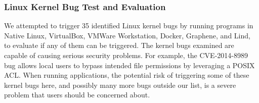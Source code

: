 \subsubsection{Linux Kernel Bug Test and Evaluation}
\label{Linux-Kernel-Bug-Test-and-Evaluation}

We attempted to trigger 35 identified Linux kernel bugs by running programs in
Native Linux, VirtualBox, VMWare Workstation, Docker, Graphene,
and Lind, to evaluate if any of them can be triggered. The kernel bugs
examined are capable of causing serious security problems. For example,
the CVE-2014-8989 bug allows local users to bypass intended file
permissions by leveraging a POSIX ACL.
When running applications, the potential risk of triggering some of these
kernel bugs here,
and possibly many more bugs outside our list, is a severe problem that
users should be concerned about.

